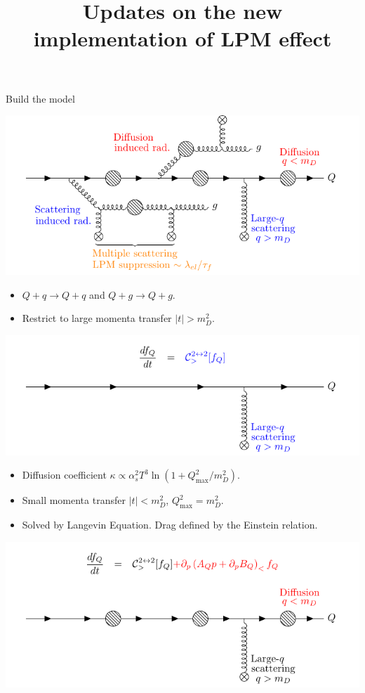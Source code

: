 \documentclass[11pt]{beamer}
\title{Updates on the new implementation of LPM effect}
\begin{document}
\begin{frame}
\titlepage
\end{frame}


\begin{frame}{Build the model}
\begin{overprint}
\vspace{1cm}
\includegraphics[width=\textwidth]{all-processes.pdf}
\vspace{1cm}
\begin{itemize}
\item $Q+q \rightarrow Q+q$ and $Q+g \rightarrow Q+g$.
\item Restrict to large momenta transfer $|t| > m_D^2$.
\end{itemize}
\includegraphics[width=.9\textwidth]{22.pdf}
\vspace{1cm}
\begin{itemize}
\item Diffusion coefficient $\kappa \propto \alpha_s^2 T^3 \ln(1+Q_{\max}^2/m_D^2)$.
\item Small momenta transfer $|t| < m_D^2$, $Q_{\max}^2=m_D^2$.
\item Solved by Langevin Equation. Drag defined by the Einstein relation.
\end{itemize}
\includegraphics[width=.9\textwidth]{22-11.pdf}

\end{overprint}
\end{frame}
\end{document}
